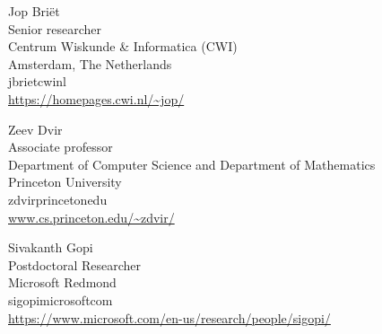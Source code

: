 \documentclass{toc}
\begin{document}

%
%
%
%


%
%
%
%
%
\begin{tocauthors}
\begin{tocinfo}[briet]
 Jop Bri\"{e}t\\
 Senior researcher\\
 Centrum Wiskunde \& Informatica (CWI)\\
 Amsterdam, The Netherlands\\
 j\tocdot{}briet\tocat{}cwi\tocdot{}nl \\   %
 \url{https://homepages.cwi.nl/~jop/}      %
\end{tocinfo}
\begin{tocinfo}[dvir]
Zeev Dvir\\
Associate professor\\
Department of Computer Science and Department of Mathematics\\
Princeton University\\
zdvir\tocat{}princeton\tocdot{}edu\\
\url{www.cs.princeton.edu/~zdvir/}
\end{tocinfo}
\begin{tocinfo}[gopi]
Sivakanth Gopi\\
Postdoctoral Researcher\\
Microsoft Redmond\\
sigopi\tocat{}microsoft\tocdot{}com\\
\url{https://www.microsoft.com/en-us/research/people/sigopi/}
\end{tocinfo}
\end{tocauthors}
\end{document}
